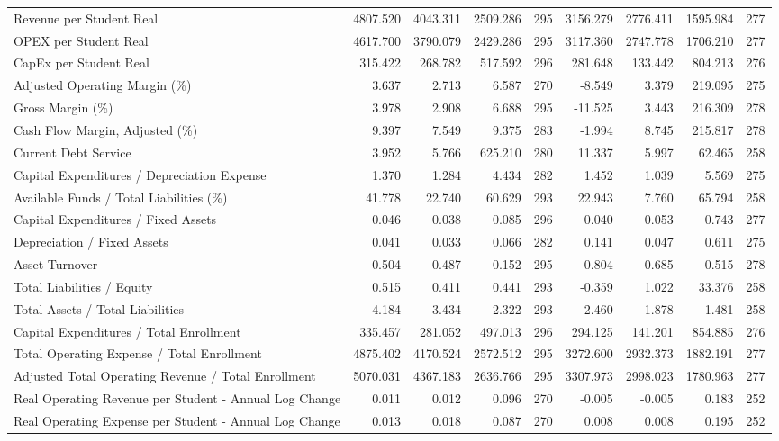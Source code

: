 \begin{table}[!htbp]
{\begin{tabular}{lrrrrrrrr}
\midrule
Revenue per Student Real & 4807.520 & 4043.311 & 2509.286 & 295 & 3156.279 & 2776.411 & 1595.984 & 277 \\
OPEX per Student Real & 4617.700 & 3790.079 & 2429.286 & 295 & 3117.360 & 2747.778 & 1706.210 & 277 \\
CapEx per Student Real & 315.422 & 268.782 & 517.592 & 296 & 281.648 & 133.442 & 804.213 & 276 \\
Adjusted Operating Margin (\%) & 3.637 & 2.713 & 6.587 & 270 & -8.549 & 3.379 & 219.095 & 275 \\
Gross Margin (\%) & 3.978 & 2.908 & 6.688 & 295 & -11.525 & 3.443 & 216.309 & 278 \\
Cash Flow Margin, Adjusted (\%) & 9.397 & 7.549 & 9.375 & 283 & -1.994 & 8.745 & 215.817 & 278 \\
Current Debt Service & 3.952 & 5.766 & 625.210 & 280 & 11.337 & 5.997 & 62.465 & 258 \\
Capital Expenditures / Depreciation Expense & 1.370 & 1.284 & 4.434 & 282 & 1.452 & 1.039 & 5.569 & 275 \\
Available Funds / Total Liabilities (\%) & 41.778 & 22.740 & 60.629 & 293 & 22.943 & 7.760 & 65.794 & 258 \\
Capital Expenditures / Fixed Assets & 0.046 & 0.038 & 0.085 & 296 & 0.040 & 0.053 & 0.743 & 277 \\
Depreciation / Fixed Assets & 0.041 & 0.033 & 0.066 & 282 & 0.141 & 0.047 & 0.611 & 275 \\
Asset Turnover & 0.504 & 0.487 & 0.152 & 295 & 0.804 & 0.685 & 0.515 & 278 \\
Total Liabilities / Equity & 0.515 & 0.411 & 0.441 & 293 & -0.359 & 1.022 & 33.376 & 258 \\
Total Assets / Total Liabilities & 4.184 & 3.434 & 2.322 & 293 & 2.460 & 1.878 & 1.481 & 258 \\
Capital Expenditures / Total Enrollment & 335.457 & 281.052 & 497.013 & 296 & 294.125 & 141.201 & 854.885 & 276 \\
Total Operating Expense / Total Enrollment & 4875.402 & 4170.524 & 2572.512 & 295 & 3272.600 & 2932.373 & 1882.191 & 277 \\
Adjusted Total Operating Revenue / Total Enrollment & 5070.031 & 4367.183 & 2636.766 & 295 & 3307.973 & 2998.023 & 1780.963 & 277 \\
Real Operating Revenue per Student - Annual Log Change & 0.011 & 0.012 & 0.096 & 270 & -0.005 & -0.005 & 0.183 & 252 \\
Real Operating Expense per Student - Annual Log Change & 0.013 & 0.018 & 0.087 & 270 & 0.008 & 0.008 & 0.195 & 252 \\

\end{tabular}}
\end{table}
